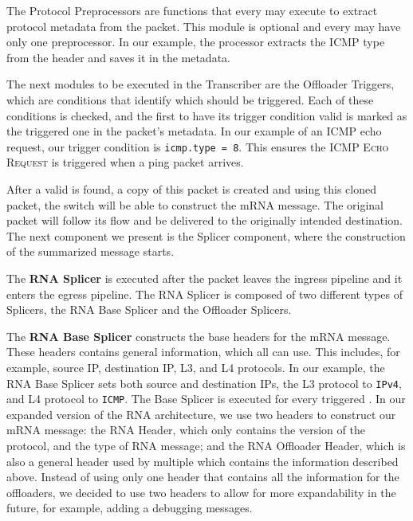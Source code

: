 The Protocol Preprocessors are functions that every \ProtocolTemplate{} may execute to extract protocol metadata from the packet. This module is optional and every \ProtocolTemplate{} may have only one preprocessor. In our example, the processor extracts the ICMP type from the header and saves it in the metadata.

The next modules to be executed in the Transcriber are the Offloader Triggers, which are conditions that identify which \Offloader{} should be triggered. Each of these conditions is checked, and the first \Offloader{} to have its trigger condition valid is marked as the triggered one in the packet's metadata. In our example of an ICMP echo request, our trigger condition is \texttt{icmp.type = 8}. This ensures the \Offloader{} \textsc{ICMP Echo Request} is triggered when a ping packet arrives.


After a valid \Offloader{} is found, a copy of this packet is created and using this cloned packet, the switch will be able to construct the mRNA message. The original packet will follow its flow and be delivered to the originally intended destination. The next component we present is the Splicer component, where the construction of the summarized message starts.

The \textbf{RNA Splicer} is executed after the packet leaves the ingress pipeline and it enters the egress pipeline\footnotemark{}. The RNA Splicer is composed of two different types of Splicers, the RNA Base Splicer and the Offloader Splicers.

The \textbf{RNA Base Splicer} constructs the base headers for the mRNA message. These headers contains general information, which all \Offloaders{} can use. This includes, for example, source IP, destination IP, L3, and L4 protocols. In our example, the RNA Base Splicer sets both source and destination IPs, the L3 protocol to \texttt{IPv4}, and L4 protocol to \texttt{ICMP}. The Base Splicer is executed for every triggered \Offloader{}. In our expanded version of the RNA architecture, we use two headers to construct our mRNA message: the RNA Header, which only contains the version of the protocol, and the type of RNA message; and the RNA Offloader Header, which is also a general header used by multiple \Offloaders{} which contains the information described above. Instead of using only one header that contains all the information for the offloaders, we decided to use two headers to allow for more expandability in the future, for example, adding a debugging messages.

